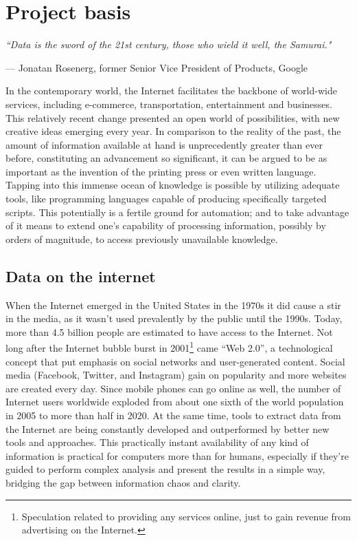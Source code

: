 \chapter{Project basis}
\label{ch:basis}
\setlength{\epigraphwidth}{11.4cm}
\epigraph{\textit{``Data is the sword of the 21st century, those who wield it well, the Samurai."}}{--- Jonatan Rosenerg, former Senior Vice President of Products, Google}

In the contemporary world, the Internet facilitates the backbone of world-wide services, including e-commerce, transportation, entertainment and businesses. This relatively recent change presented an open world of possibilities, with new creative ideas emerging every year. In comparison to the reality of the past, the amount of information available at hand is unprecedently greater than ever before, constituting an advancement so significant, it can be argued to be as important as the invention of the printing press or even written language. Tapping into this immense ocean of knowledge is possible by utilizing adequate tools, like programming languages capable of producing specifically targeted scripts. This potentially is a fertile ground for automation; and to take advantage of it means to extend one's capability of processing information, possibly by orders of magnitude, to access previously unavailable knowledge.


\section{Data on the internet}
When the Internet emerged in the United States in the 1970s it did cause a stir in the media, as it wasn't used prevalently by the public until the 1990s. Today, more than 4.5 billion people are estimated to have access to the Internet. Not long after the Internet bubble burst in 2001\footnote{Speculation related to providing any services online, just to gain revenue from advertising on the Internet.} came ``Web 2.0'', a technological concept that put emphasis on social networks and user-generated content. Social media (Facebook, Twitter, and Instagram) gain on popularity and more websites are created every day. Since mobile phones can go online as well, the number of Internet users worldwide exploded from about one sixth of the world population in 2005 to more than half in 2020. At the same time, tools to extract data from the Internet are being constantly developed and outperformed by better new tools and approaches. This practically instant availability of any kind of information is practical for computers more than for humans, especially if they're guided to perform complex analysis and present the results in a simple way, bridging the gap between information chaos and clarity.


